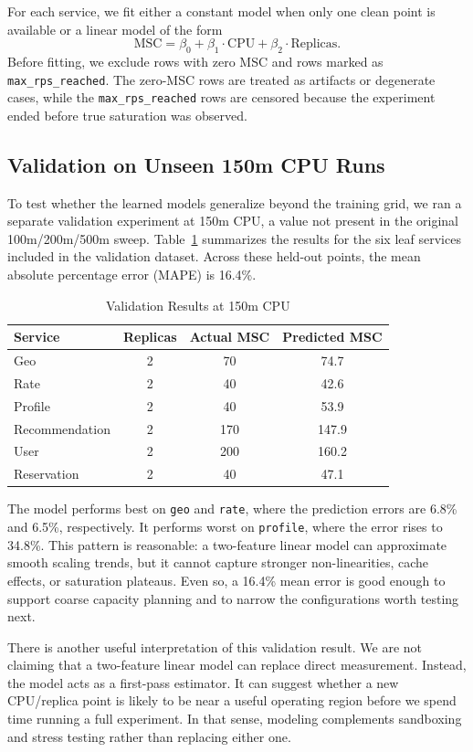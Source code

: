 \documentclass[conference]{IEEEtran}
\begin{document}
For each service, we fit either a constant model when only one clean point is available or a linear model of the form
\[
\text{MSC} = \beta_0 + \beta_1 \cdot \text{CPU} + \beta_2 \cdot \text{Replicas}.
\]
Before fitting, we exclude rows with zero MSC and rows marked as \texttt{max\_rps\_reached}. The zero-MSC rows are treated as artifacts or degenerate cases, while the \texttt{max\_rps\_reached} rows are censored because the experiment ended before true saturation was observed.

\subsection{Validation on Unseen 150m CPU Runs}
To test whether the learned models generalize beyond the training grid, we ran a separate validation experiment at 150m CPU, a value not present in the original 100m/200m/500m sweep. Table~\ref{tab:validation} summarizes the results for the six leaf services included in the validation dataset. Across these held-out points, the mean absolute percentage error (MAPE) is 16.4\%.

\begin{table}[t]
\caption{Validation Results at 150m CPU}
\label{tab:validation}
\centering
\begin{tabular}{lccc}
\toprule
Service & Replicas & Actual MSC & Predicted MSC \\
\midrule
Geo & 2 & 70 & 74.7 \\
Rate & 2 & 40 & 42.6 \\
Profile & 2 & 40 & 53.9 \\
Recommendation & 2 & 170 & 147.9 \\
User & 2 & 200 & 160.2 \\
Reservation & 2 & 40 & 47.1 \\
\bottomrule
\end{tabular}
\end{table}

The model performs best on \texttt{geo} and \texttt{rate}, where the prediction errors are 6.8\% and 6.5\%, respectively. It performs worst on \texttt{profile}, where the error rises to 34.8\%. This pattern is reasonable: a two-feature linear model can approximate smooth scaling trends, but it cannot capture stronger non-linearities, cache effects, or saturation plateaus. Even so, a 16.4\% mean error is good enough to support coarse capacity planning and to narrow the configurations worth testing next.

There is another useful interpretation of this validation result. We are not claiming that a two-feature linear model can replace direct measurement. Instead, the model acts as a first-pass estimator. It can suggest whether a new CPU/replica point is likely to be near a useful operating region before we spend time running a full experiment. In that sense, modeling complements sandboxing and stress testing rather than replacing either one.
\end{document}
